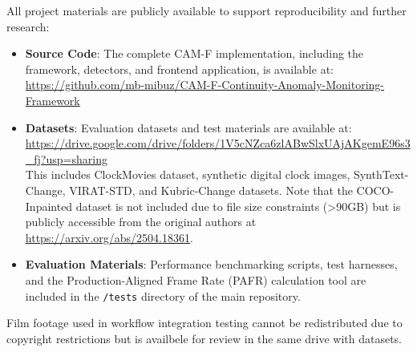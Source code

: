 All project materials are publicly available to support reproducibility and further research:

\begin{itemize}
    \item \textbf{Source Code}: The complete CAM-F implementation, including the framework, detectors, and frontend application, is available at:\\
    \url{https://github.com/mb-mibuz/CAM-F-Continuity-Anomaly-Monitoring-Framework}\\
    
    \item \textbf{Datasets}: Evaluation datasets and test materials are available at:\\
    \url{https://drive.google.com/drive/folders/1V5cNZca6zlABwSlxUAjAKgemE96s3_fj?usp=sharing}\\
    This includes ClockMovies dataset, synthetic digital clock images, SynthText-Change, VIRAT-STD, and Kubric-Change datasets. Note that the COCO-Inpainted dataset is not included due to file size constraints (>90GB) but is publicly accessible from the original authors at \url{https://arxiv.org/abs/2504.18361}.
    
    \item \textbf{Evaluation Materials}: Performance benchmarking scripts, test harnesses, and the Production-Aligned Frame Rate (PAFR) calculation tool are included in the \texttt{/tests} directory of the main repository.
\end{itemize}

Film footage used in workflow integration testing cannot be redistributed due to copyright restrictions but is availbele for review in the same drive with datasets.